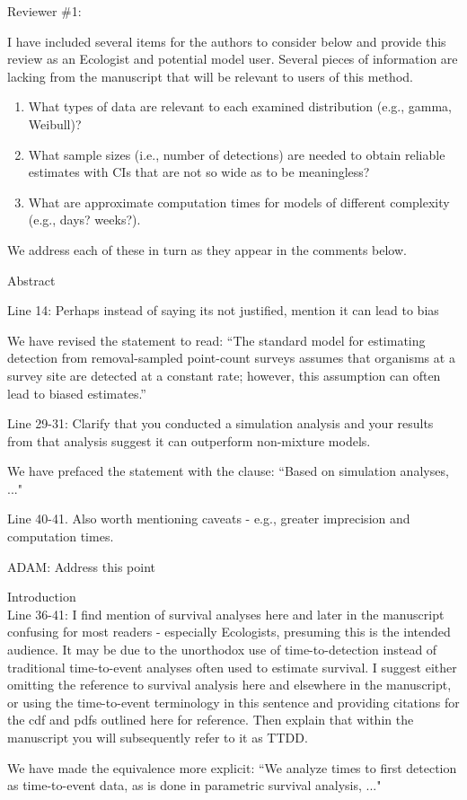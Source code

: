 \documentclass[12pt]{article}
\renewenvironment{quote}  %
              {\list{}{\rightmargin\leftmargin}\normalfont%
               \item\relax}
              {\endlist}
\newcommand{\adam}[1]{{\color{blue} ADAM: #1}}
\begin{document}
\newpage



Reviewer \#1:

I have included several items for the authors to consider below and provide this review as an Ecologist and potential model user.
Several pieces of information are lacking from the manuscript that will be relevant to users of this method.
\begin{enumerate}
\item What types of data are relevant to each examined distribution (e.g., gamma, Weibull)?
\item What sample sizes (i.e., number of detections) are needed to obtain reliable estimates with CIs that are not so wide as to be meaningless?
\item What are approximate computation times for models of different complexity (e.g., days? weeks?).
\end{enumerate}
\begin{quote}
We address each of these in turn as they appear in the comments below.
\end{quote}


Abstract

Line 14: Perhaps instead of saying its not justified, mention it can lead to bias
\begin{quote}
We have revised the statement to read: ``The standard model for estimating detection from removal-sampled point-count surveys assumes that organisms at a survey site are detected at a constant rate; however, this assumption can often lead to biased estimates.''
\end{quote}

Line 29-31: Clarify that you conducted a simulation analysis and your results from that analysis suggest it can outperform non-mixture models.
\begin{quote}
We have prefaced the statement with the clause: ``Based on simulation analyses, ..."
\end{quote}

Line 40-41.  Also worth mentioning caveats - e.g., greater imprecision and computation times.
\begin{quote}
\adam{Address this point}
\end{quote}

Introduction\\
Line 36-41: I find mention of survival analyses here and later in the manuscript confusing for most readers - especially Ecologists, presuming this is the intended audience.  It may be due to the unorthodox use of time-to-detection instead of traditional time-to-event analyses often used to estimate survival.  I suggest either omitting the reference to survival analysis here and elsewhere in the manuscript, or using the time-to-event terminology in this sentence and providing citations for the cdf and pdfs outlined here for reference.  Then explain that within the manuscript you will subsequently refer to it as TTDD.  
\begin{quote}
We have made the equivalence more explicit: ``We analyze times to first detection as time-to-event data, as is done in parametric survival analysis, ..."
\end{quote}
\end{document}
